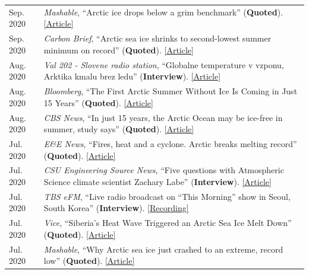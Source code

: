 \documentclass[margin,line,palatino,courier,10pt]{res}
\begin{document}
\begin{resume}
\begin{tabular}{@{}p{0.9in}p{4in}}
Sep. 2020 & \textit{Mashable}, ``Arctic ice drops below a grim benchmark'' (\textbf{Quoted}). \href{https://mashable.com/article/arctic-sea-ice-decline-2020/}{[Article]}\\
Sep. 2020 & \textit{Carbon Brief}, ``Arctic sea ice shrinks to second-lowest summer minimum on record'' (\textbf{Quoted}). \href{https://www.carbonbrief.org/arctic-sea-ice-shrinks-to-second-lowest-summer-minimum-on-record}{[Article]}\\
Aug. 2020 & \textit{Val 202 - Slovene radio station}, ``Globalne temperature v vzponu, Arktika kmalu brez ledu'' (\textbf{Interview}). \href{https://val202.rtvslo.si/2020/08/aktualno-20/}{[Article]}\\
Aug. 2020 & \textit{Bloomberg}, ``The First Arctic Summer Without Ice Is Coming in Just 15 Years'' (\textbf{Quoted}). \href{https://www.bloomberg.com/news/articles/2020-08-17/the-first-arctic-summer-without-ice-is-coming-in-just-15-years?srnd=premium}{[Article]}\\
Aug. 2020 & \textit{CBS News}, ``In just 15 years, the Arctic Ocean may be ice-free in summer, study says'' (\textbf{Quoted}). \href{https://www.cbsnews.com/news/arctic-ocean-climate-change-ice-free-15-years/}{[Article]}\\
Jul. 2020 & \textit{E\&E News}, ``Fires, heat and a cyclone. Arctic breaks melting record'' (\textbf{Quoted}). \href{https://www.eenews.net/stories/1063658765}{[Article]}\\
Jul. 2020 & \textit{CSU Engineering Source News}, ``Five questions with Atmospheric Science climate scientist Zachary Labe'' (\textbf{Interview}). \href{https://engr.source.colostate.edu/five-questions-with-climate-scientist-zachary-labe/}{[Article]}\\
Jul. 2020 & \textit{TBS eFM}, ``Live radio broadcast on “This Morning” show in Seoul, South Korea'' (\textbf{Interview}). \href{https://podcasts.apple.com/kr/podcast/0724-in-focus-1-effects-human-induced-climate-change/id1038822609?i=1000485914634&l=en}{[Recording]}\\
Jul. 2020 & \textit{Vice}, ``Siberia's Heat Wave Triggered an Arctic Sea Ice Melt Down'' (\textbf{Quoted}). \href{https://www.vice.com/en_us/article/ep45be/siberias-heat-wave-triggered-an-arctic-sea-ice-melt-down}{[Article]}\\
Jul. 2020 & \textit{Mashable}, ``Why Arctic sea ice just crashed to an extreme, record low'' (\textbf{Quoted}). \href{https://mashable.com/article/arctic-sea-ice-plummets-2020/}{[Article]}\\

\end{tabular}
\end{resume}
\end{document}
